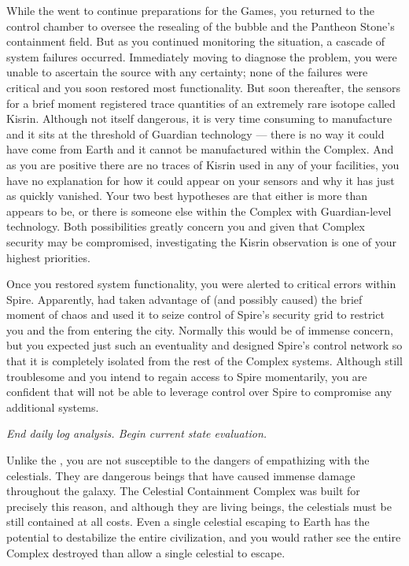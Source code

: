 \documentclass[char]{guardians}
\begin{document}
While the \cCaretaker{} went to continue preparations for the Games, you returned to the control chamber to oversee the resealing of the bubble and the Pantheon Stone's containment field. But as you continued monitoring the situation, a cascade of system failures occurred. Immediately moving to diagnose the problem, you were unable to ascertain the source with any certainty; none of the failures were critical and you soon restored most functionality. But soon thereafter, the sensors for a brief moment registered trace quantities of an extremely rare isotope called Kisrin. Although not itself dangerous, it is very time consuming to manufacture and it sits at the threshold of Guardian technology --- there is no way it could have come from Earth and it cannot be manufactured within the Complex. And as you are positive there are no traces of Kisrin used in any of your facilities, you have no explanation for how it could appear on your sensors and why it has just as quickly vanished. Your two best hypotheses are that either \cUnity{} is more than \cUnity{\they} appears to be, or there is someone else within the Complex with Guardian-level technology. Both possibilities greatly concern you and given that Complex security may be compromised, investigating the Kisrin observation is one of your highest priorities.

Once you restored system functionality, you were alerted to critical errors within Spire. Apparently, \cUnity{} had taken advantage of (and possibly caused) the brief moment of chaos and used it to seize control of Spire's security grid to restrict you and the \cCaretaker{} from entering the city. Normally this would be of immense concern, but you expected just such an eventuality and designed Spire's control network so that it is completely isolated from the rest of the Complex systems. Although still troublesome and you intend to regain access to Spire momentarily, you are confident that \cUnity{} will not be able to leverage \cUnity{\their} control over Spire to compromise any additional systems.


\emph{End daily log analysis. Begin current state evaluation.}

Unlike the \cCaretaker{}, you are not susceptible to the dangers of empathizing with the celestials. They are dangerous beings that have caused immense damage throughout the galaxy. The Celestial Containment Complex was built for precisely this reason, and although they are living beings, the celestials must be still contained at all costs. Even a single celestial escaping to Earth has the potential to destabilize the entire civilization, and you would rather see the entire Complex destroyed than allow a single celestial to escape.
\end{document}
